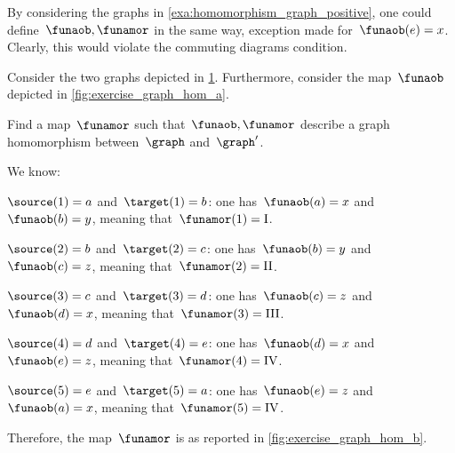 \begin{example}[Counterexample]
    By considering the graphs in \cref{exa:homomorphism_graph_positive}, one could define~$\funaob,\funamor$ in the same way, exception made for~$\funaob(e)=x$.
    Clearly, this would violate the commuting diagrams condition.
\end{example}

\begin{exercise}
    Consider the two graphs depicted in \cref{fig:ex_graph_hom}.
    Furthermore, consider the map~$\funaob$ depicted in \cref{fig:exercise_graph_hom_a}.
    \begin{figure}[h]
        \centering
        \caption{
            \label{fig:ex_graph_hom}}
    \end{figure}
    \begin{marginfigure}
        \begin{center}
        \end{center}
        \caption{\label{fig:exercise_graph_hom_a}}
    \end{marginfigure}

    Find a map~$\funamor$ such that~$\funaob,\funamor$ describe a graph homomorphism between~$\graph$ and~$\graph'$.
\end{exercise}

\begin{solution}
    We know:
    \begin{compactitem}
        \item $\source(1)=a$ and~$\target(1)=b$: one has~$\funaob(a)=x$ and~$\funaob(b)=y$, meaning that~$\funamor(1)=\text{I}$.
        \item $\source(2)=b$ and~$\target(2)=c$: one has~$\funaob(b)=y$ and~$\funaob(c)=z$, meaning that~$\funamor(2)=\text{II}$.
        \item $\source(3)=c$ and~$\target(3)=d$: one has~$\funaob(c)=z$ and~$\funaob(d)=x$, meaning that~$\funamor(3)=\text{III}$.
        \item $\source(4)=d$ and~$\target(4)=e$: one has~$\funaob(d)=x$ and~$\funaob(e)=z$, meaning that~$\funamor(4)=\text{IV}$.
        \item $\source(5)=e$ and~$\target(5)=a$: one has~$\funaob(e)=z$ and~$\funaob(a)=x$, meaning that~$\funamor(5)=\text{IV}$.
    \end{compactitem}
    Therefore, the map~$\funamor$ is as reported in \cref{fig:exercise_graph_hom_b}.

    \begin{marginfigure}
        \begin{center}
        \end{center}
        \caption{\label{fig:exercise_graph_hom_b}}
    \end{marginfigure}
\end{solution}
